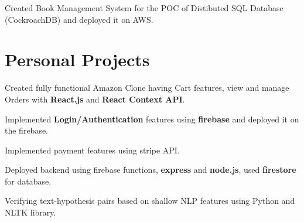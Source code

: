 \documentclass[]{plushcv}
\begin{document}
\begin{minipage}[t]{0.70\textwidth}
\begin{tightemize}
\sectionsep
\item Created Book Management System for the POC of Distibuted SQL Database (CockroachDB) and deployed it on AWS.
\end{tightemize}
\sectionsep



\section{Personal Projects}

\begin{tightemize}
\item Created fully functional Amazon Clone having Cart features, view and manage Orders with \textbf{React.js} and \textbf{React Context API}.
\item Implemented \textbf{Login/Authentication} features using \textbf{firebase} and deployed it on the firebase.
\item Implemented payment features using stripe API.
\item Deployed backend using firebase functions, \textbf{express} and \textbf{node.js}, used \textbf{firestore} for database.
\end{tightemize}
\sectionsep

\begin{tightemize}
\item Verifying text-hypothesis pairs based on shallow NLP features using Python and NLTK library. 
\end{tightemize}
\sectionsep


%
%

\end{minipage} 
\end{document}
